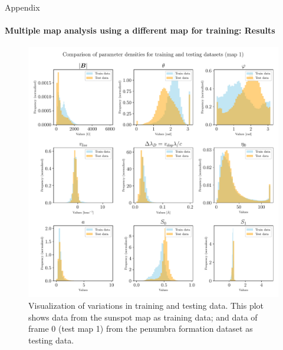 \documentclass{beamer}
\begin{document}
\begin{frame}[allowframebreaks]{Appendix}
	\framesubtitle{Multiple map analysis using a different map for training: Results} %
	\begin{figure}
		\begin{minipage}[c]{0.67\textwidth}
			\includegraphics[width=\textwidth]{figures/thesis/nf-milne-eddington-example-4-nflows-piecewisequadratic-comp-paramdens-traintest-1.pdf}
		\end{minipage}\hfill
		\begin{minipage}[c]{0.3\textwidth}
			\caption{Visualization of variations in training and testing data. This plot shows data from the sunspot map as training data; and data of frame 0 (test map 1) from the penumbra formation dataset as testing data.
			} \label{fig:nf-milne-eddington-example-4-nflows-piecewisequadratic-comp-paramdens-traintest-1}
		\end{minipage}
	\end{figure}
\end{frame}
\end{document}
